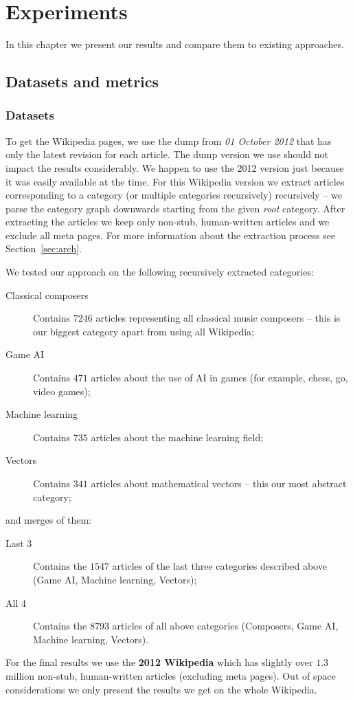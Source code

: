 \chapter{Experiments}
\label{cap:experiments}

In this chapter we present our results and compare them to existing approaches.

\section{Datasets and metrics}

\subsection{Datasets}

To get the Wikipedia pages, we use the dump from \emph{01 October 2012} that
has only the latest revision for each article. The dump version we use should
not impact the results considerably. We happen to use the 2012 version just
because it was easily available at the time.
For this Wikipedia version we extract articles corresponding to a category (or
multiple categories recursively) recursively -- we parse the category graph
downwards starting from the given \emph{root} category. After extracting the
articles we keep only non-stub, human-written articles and we exclude all meta
pages. For more information about the extraction process see
Section~\vref{sec:arch}.

We tested our approach on the following recursively extracted categories:
\begin{description}
  \item[Classical composers] Contains \(7246\) articles representing all
  classical music composers -- this is our biggest category apart from using all
  Wikipedia;
  \item[Game \acl{AI}] Contains \(471\) articles about the use
  of \ac{AI} in games (for example, chess, go, video games);
  \item[Machine learning] Contains \(735\) articles about the machine learning
  field;
  \item[Vectors] Contains \(341\) articles about mathematical vectors -- this
  our most abstract category;
\end{description}
and merges of them:
\begin{description}
  \item[Last 3] Contains the \(1547\) articles of the last three categories
  described above (Game \ac{AI}, Machine learning, Vectors);
  \item[All 4] Contains the \(8793\) articles of all above categories
  (Composers, Game \ac{AI}, Machine learning, Vectors).
\end{description}
For the final results we use the \textbf{2012 Wikipedia} which has slightly
over \(1.3\) million non-stub, human-written articles (excluding meta pages).
Out of space considerations we only present the results we get on the whole
Wikipedia.

